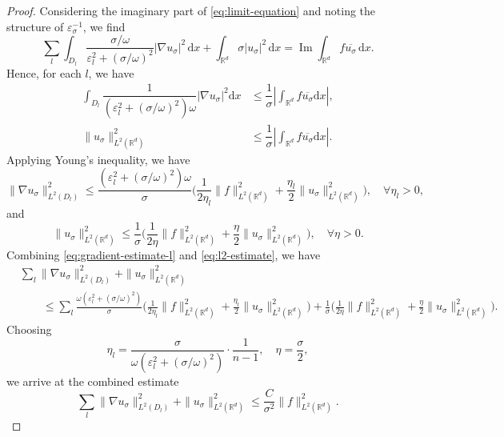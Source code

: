 \documentclass[12pt,reqno]{amsart}
\numberwithin{equation}{section}
\begin{document}
\begin{proof}
Considering the imaginary part of \eqref{eq:limit-equation} and noting the structure of $\varepsilon_\sigma^{-1}$, we find
\begin{equation*}
    \sum_{l} \int_{D_l} \frac{\sigma/\omega}{\varepsilon_l^2 + (\sigma/\omega)^2} |\nabla u_\sigma|^2\,\mathrm{d}x + \int_{\mathbb{R}^d} \sigma |u_\sigma|^2\,\mathrm{d}x = \operatorname{Im} \int_{\mathbb{R}^d} f\overline{u_\sigma}\,\mathrm{d}x.
\end{equation*}
Hence, for each $l$, we have
\begin{align}
\int_{D_l}\dfrac{1}{(\varepsilon_{l}^2+(\sigma/\omega)^2)\omega}|\nabla u_\sigma|^2\mathrm{d}x &\leq \dfrac{1}{\sigma}\left|\int_{\mathbb{R}^d}f\overline{u_\sigma}\mathrm{d}x\right|, \label{eq:l2-grad-l} \\
\|u_\sigma\|_{L^2(\mathbb{R}^d)}^2 &\leq \dfrac{1}{\sigma}\left|\int_{\mathbb{R}^d}f\overline{u_\sigma}\mathrm{d}x\right|. \label{eq:l2-norm-u}
\end{align}
Applying Young's inequality, we have
\begin{equation}\label{eq:gradient-estimate-l}
\|\nabla u_\sigma\|_{L^2(D_l)}^2 \leq \frac{(\varepsilon_l^2 + (\sigma/\omega)^2)\omega}{\sigma}\biggl(\frac{1}{2\eta_l}\|f\|_{L^2(\mathbb{R}^d)}^2 + \frac{\eta_l}{2}\|u_\sigma\|_{L^2(\mathbb{R}^d)}^2\biggr), \quad \forall \eta_l > 0,
\end{equation}
and
\begin{equation}\label{eq:l2-estimate}
\|u_\sigma\|_{L^2(\mathbb{R}^d)}^2 \leq \frac{1}{\sigma}\biggl(\frac{1}{2\eta}\|f\|_{L^2(\mathbb{R}^d)}^2 + \frac{\eta}{2}\|u_\sigma\|_{L^2(\mathbb{R}^d)}^2\biggr), \quad \forall \eta > 0.
\end{equation}
Combining \eqref{eq:gradient-estimate-l} and \eqref{eq:l2-estimate}, we have
\begin{align*}
&\sum_{l} \|\nabla u_\sigma\|_{L^2(D_l)}^2 + \|u_\sigma\|_{L^2(\mathbb{R}^d)}^2 \\
&\qquad \leq \sum_{l} \frac{\omega(\varepsilon_l^2 + (\sigma/\omega)^2)}{\sigma}\biggl(\frac{1}{2\eta_l}\|f\|_{L^2(\mathbb{R}^d)}^2 + \frac{\eta_l}{2}\|u_\sigma\|_{L^2(\mathbb{R}^d)}^2\biggr) + \frac{1}{\sigma}\biggl(\frac{1}{2\eta}\|f\|_{L^2(\mathbb{R}^d)}^2 + \frac{\eta}{2}\|u_\sigma\|_{L^2(\mathbb{R}^d)}^2\biggr).
\end{align*}
Choosing
\[
\eta_l = \frac{\sigma}{\omega(\varepsilon_l^2 + (\sigma/\omega)^2)} \cdot \frac{1}{n-1}, \quad \eta = \frac{\sigma}{2},
\]
 we arrive at the combined estimate
\begin{equation}\label{eq:combined-estimate}
\sum_{l} \|\nabla u_\sigma\|_{L^2(D_l)}^2 + \|u_\sigma\|_{L^2(\mathbb{R}^d)}^2 \leq \frac{C}{\sigma^2}\|f\|_{L^2(\mathbb{R}^d)}^2.
\end{equation}






\end{proof}
\end{document}
